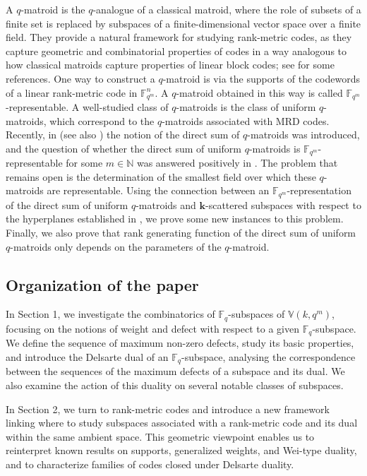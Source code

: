 \documentclass[11pt]{amsart}
\newcommand{\fqm}{\mathbb{F}_{q^m}}
\newcommand{\F}{{\mathbb F}}
\begin{document}
A $q$-matroid is the $q$-analogue of a classical matroid, where the role of subsets of a finite set is replaced by subspaces of a finite-dimensional vector space over a finite field. They provide a natural framework for studying rank-metric codes, as they capture geometric and combinatorial properties of codes in a way analogous to how classical matroids capture properties of linear block codes; see \cite{gorla2019rank, shiromoto2019codes, ghorpade2020polymatroid, byrne2022constructions, byrne2021weighted, gluesing2021q} for some references. One way to construct a $q$-matroid is via the supports of the codewords of a linear rank-metric code in $\F_{q^m}^n$. A $q$-matroid obtained in this way is called $\mathbb{F}_{q^m}$-representable. A well-studied class of $q$-matroids is the class of uniform $q$-matroids, which correspond to the $q$-matroids associated with MRD codes. Recently, in \cite{ceria2021direct} (see also \cite{gluesing2023decompositions}) the notion of the direct sum of $q$-matroids was introduced, and the question of whether the direct sum of uniform $q$-matroids is $\F_{q^m}$-representable for some $m \in \mathbb{N}$ was answered positively in \cite{alfarano2024representability}.
The problem that remains open is the determination of the smallest field over which these $q$-matroids are representable.
Using the connection between an $\fqm$-representation of the direct sum of uniform $q$-matroids and $\mathbf{k}$-scattered subspaces with respect to the hyperplanes established in \cite{alfarano2024representability}, we prove some new instances to this problem.
Finally, we also prove that rank generating function of the direct sum of uniform $q$-matroids only depends on the parameters of the $q$-matroid.

\subsection*{Organization of the paper}

In Section 1, we investigate the combinatorics of $\F_q$-subspaces of $\mathbb{V}(k,q^m)$, focusing on the notions of weight and defect with respect to a given $\F_q$-subspace. We define the sequence of maximum non-zero defects, study its basic properties, and introduce the Delsarte dual of an $\F_q$-subspace, analysing the correspondence between the sequences of the maximum defects of a subspace and its dual. We also examine the action of this duality on several notable classes of subspaces.

In Section 2, we turn to rank-metric codes and introduce a new framework linking where to study subspaces associated with a rank-metric code and its dual within the same ambient space. This geometric viewpoint enables us to reinterpret known results on supports, generalized weights, and Wei-type duality, and to characterize families of codes closed under Delsarte duality.
\end{document}

